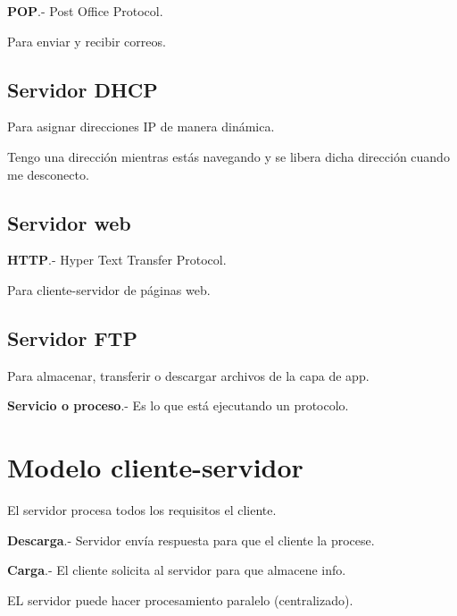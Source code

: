 \documentclass{article}
\begin{document}
\textbf{POP}.- Post Office Protocol.
\vspace{1em}

Para enviar y recibir correos.
\vspace{1em}

\subsection{Servidor DHCP}

Para asignar direcciones IP de manera dinámica.
\vspace{1em}

Tengo una dirección mientras estás navegando y se libera dicha dirección cuando
me desconecto.
\vspace{1em}

\subsection{Servidor web}

\textbf{HTTP}.- Hyper Text Transfer Protocol.
\vspace{1em}

Para cliente-servidor de páginas web.
\vspace{1em}

\subsection{Servidor FTP}

Para almacenar, transferir o descargar archivos de la capa de app.
\vspace{1em}

\textbf{Servicio o proceso}.- Es lo que está ejecutando un protocolo.
\vspace{1em}

\section{Modelo cliente-servidor}

El servidor procesa todos los requisitos el cliente.
\vspace{1em}

\textbf{Descarga}.- Servidor envía respuesta para que el cliente la procese.
\vspace{1em}

\textbf{Carga}.- El cliente solicita al servidor para que almacene info.
\vspace{1em}

EL servidor puede hacer procesamiento paralelo (centralizado).
\vspace{1em}
\end{document}
